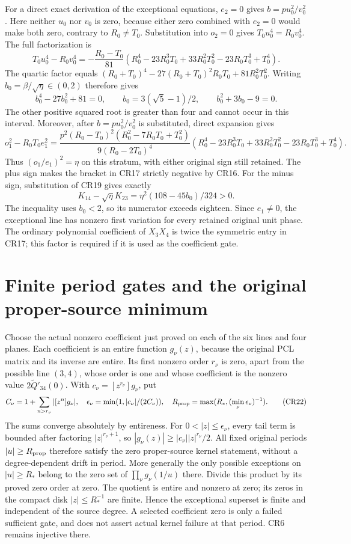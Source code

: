 For a direct exact derivation of the exceptional equations,
$e_2=0$ gives $b=p u_0^2/v_0^2$.  Here neither $u_0$ nor $v_0$
is zero, because either zero combined with $e_2=0$ would make
both zero, contrary to $R_0\ne T_0$.  Substitution into $o_2=0$
gives $T_0u_0^4=R_0v_0^4$.  The full factorization is
\[
 T_0u_0^4-R_0v_0^4
 =-\frac{R_0-T_0}{81}
  (R_0^4-23R_0^3T_0+33R_0^2T_0^2-23R_0T_0^3+T_0^4).           \tag{CR18}
\]
The quartic factor equals
$(R_0+T_0)^4-27(R_0+T_0)^2R_0T_0+81R_0^2T_0^2$.
Writing $b_0=\beta/\sqrt\eta\in(0,2)$ therefore gives
\[
 b_0^4-27b_0^2+81=0,\qquad
 b_0=3(\sqrt5-1)/2,\qquad b_0^2+3b_0-9=0.                     \tag{CR19}
\]
The other positive squared root is greater than four and cannot
occur in this interval.  Moreover, after $b=p u_0^2/v_0^2$
is substituted, direct expansion gives
\[
 o_1^2-R_0T_0e_1^2=
 \frac{p^2(R_0-T_0)^2(R_0^2-7R_0T_0+T_0^2)}{9(R_0-2T_0)^4}
 (R_0^4-23R_0^3T_0+33R_0^2T_0^2-23R_0T_0^3+T_0^4).
                                                                    \tag{CR20}
\]
Thus $(o_1/e_1)^2=\eta$ on this stratum, with either original
sign still retained.  The plus sign makes the bracket in CR17
strictly negative by CR16.  For the minus sign, substitution of
CR19 gives exactly
\[
 K_{14}-\sqrt\eta K_{23}
       =\eta^2(108-45b_0)/324>0.                                \tag{CR21}
\]
The inequality uses $b_0<2$, so its numerator exceeds eighteen.
Since $e_1\ne0$, the exceptional line has nonzero first variation
for every retained original unit phase.  The ordinary polynomial
coefficient of $X_3X_4$ is twice the symmetric entry in CR17;
this factor is required if it is used as the coefficient gate.

\section{Finite period gates and the original proper-source minimum}
Choose the actual nonzero coefficient just proved on each of the
six lines and four planes.  Each coefficient is an entire
function $g_\nu(z)$, because the original PCL matrix and its
inverse are entire.  Its first nonzero order $r_\nu$ is zero,
apart from the possible line $(3,4)$, whose order is one and
whose coefficient is the nonzero value $2\widetilde Q'_{34}(0)$.
With $c_\nu=[z^{r_\nu}]g_\nu$, put
\[
 C_\nu=1+\sum_{n>r_\nu}|[z^n]g_\nu|,\quad
 \epsilon_\nu=\min(1,|c_\nu|/(2C_\nu)),\quad
 R_{\rm prop}=\max(R_*,(\min_\nu\epsilon_\nu)^{-1}).             \tag{CR22}
\]
The sums converge absolutely by entireness.  For
$0<|z|\le\epsilon_\nu$, every tail term is bounded after factoring
$|z|^{r_\nu+1}$, so
$|g_\nu(z)|\ge |c_\nu||z|^{r_\nu}/2$.  All fixed original periods
$|u|\ge R_{\rm prop}$ therefore satisfy the zero proper-source
kernel statement, without a degree-dependent drift in period.
More generally the only possible exceptions on $|u|\ge R_*$
belong to the zero set of $\prod_\nu g_\nu(1/u)$ there.
Divide this product by its proved zero order at zero.  The quotient
is entire and nonzero at zero; its zeros in the compact disk
$|z|\le R_*^{-1}$ are finite.  Hence the exceptional superset is
finite and independent of the source degree.  A selected coefficient
zero is only a failed sufficient gate, and does not assert actual
kernel failure at that period.  CR6 remains injective there.

